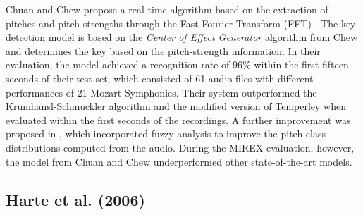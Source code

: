 
Chuan and Chew propose a real-time algorithm based on the extraction of pitches and pitch-strengths through the Fast Fourier Transform (FFT) \cite{chuan2005polyphonic}. The key detection model is based on the \emph{Center of Effect Generator} algorithm from Chew \cite{chew2002spiral} and determines the key based on the pitch-strength information. In their evaluation, the model achieved a recognition rate of 96\% within the first fifteen seconds of their test set, which consisted of 61 audio files with different performances of 21 Mozart Symphonies. Their system outperformed the Krumhansl-Schmuckler algorithm and the modified version of Temperley when evaluated within the first seconds of the recordings. A further improvement was proposed in \cite{chuan2005fuzzy}, which incorporated fuzzy analysis to improve the pitch-class distributions computed from the audio. During the MIREX evaluation, however, the model from Chuan and Chew underperformed other state-of-the-art models.


\subsection{Harte et al. (2006)}

